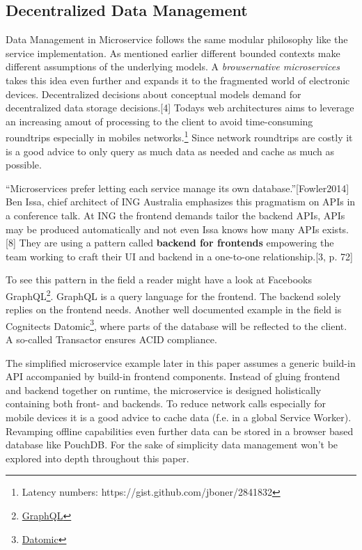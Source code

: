 \documentclass[]{article}
\begin{document}
\subsection{Decentralized Data
Management}\label{decentralized-data-management}

Data Management in Microservice follows the same modular philosophy like
the service implementation. As mentioned earlier different bounded
contexts make different assumptions of the underlying models. A
\emph{browsernative microservices} takes this idea even further and
expands it to the fragmented world of electronic devices. Decentralized
decisions about conceptual models demand for decentralized data storage
decisions.{[}4{]} Todays web architectures aims to leverage an
increasing amout of processing to the client to avoid time-consuming
roundtrips especially in mobiles networks.\footnote{Latency numbers:
  https://gist.github.com/jboner/2841832} Since network roundtrips are
costly it is a good advice to only query as much data as needed and
cache as much as possible.

``Microservices prefer letting each service manage its own
database.''{[}Fowler2014{]} Ben Issa, chief architect of ING Australia
emphasizes this pragmatism on APIs in a conference talk. At ING the
frontend demands tailor the backend APIs, APIs may be produced
automatically and not even Issa knows how many APIs exists.{[}8{]} They
are using a pattern called \textbf{backend for frontends} empowering the
team working to craft their UI and backend in a one-to-one
relationship.{[}3, p. 72{]}

To see this pattern in the field a reader might have a look at Facebooks
GraphQL\footnote{\href{http://graphql.org/}{GraphQL}}. GraphQL is a
query language for the frontend. The backend solely replies on the
frontend needs. Another well documented example in the field is
Cognitects Datomic\footnote{\href{http://www.datomic.com/}{Datomic}},
where parts of the database will be reflected to the client. A so-called
Transactor ensures ACID compliance.

The simplified microservice example later in this paper assumes a
generic build-in API accompanied by build-in frontend components.
Instead of gluing frontend and backend together on runtime, the
microservice is designed holistically containing both front- and
backends. To reduce network calls especially for mobile devices it is a
good advice to cache data (f.e. in a global Service Worker). Revamping
offline capabilities even further data can be stored in a browser based
database like PouchDB. For the sake of simplicity data management won't
be explored into depth throughout this paper.
\end{document}

